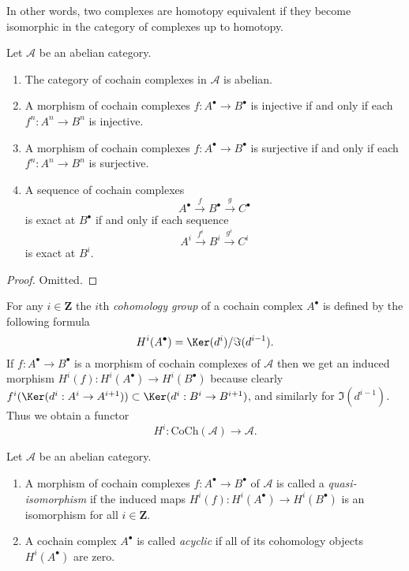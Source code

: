 \noindent
In other words, two complexes are homotopy equivalent if they become
isomorphic in the category of complexes up to homotopy.

\begin{lemma}
\label{lemma-cat-cochain-abelian}
Let $\mathcal{A}$ be an abelian category.
\begin{enumerate}
\item The category of cochain complexes in $\mathcal{A}$ is
abelian.
\item A morphism of cochain complexes
$f : A^\bullet \to B^\bullet$ is injective
if and only if each $f^n : A^n \to B^n$ is injective.
\item A morphism of cochain complexes
$f : A^\bullet \to B^\bullet$ is surjective
if and only if each $f^n : A^n \to B^n$ is surjective.
\item A sequence of cochain complexes
$$
A^\bullet \xrightarrow{f} B^\bullet \xrightarrow{g} C^\bullet
$$
is exact at $B^\bullet$ if and only if each sequence
$$
A^i \xrightarrow{f^i} B^i \xrightarrow{g^i} C^i
$$
is exact at $B^i$.
\end{enumerate}
\end{lemma}

\begin{proof}
Omitted.
\end{proof}

\noindent
For any $i \in \mathbf{Z}$ the $i$th {\it cohomology group}
of a cochain complex $A^\bullet$ is defined by
the following formula
$$
H^i(A^\bullet) = \Ker(d^i)/\Im(d^{i - 1}).
$$
If $f : A^\bullet \to B^\bullet$ is a morphism of cochain
complexes of $\mathcal{A}$ then we get an induced
morphism $H^i(f) : H^i(A^\bullet) \to H^i(B^\bullet)$
because clearly
$f^i(\Ker(d^i : A^i \to A^{i + 1})) \subset
\Ker(d^i : B^i \to B^{i + 1})$, and similarly
for $\Im(d^{i - 1})$.
Thus we obtain a functor
$$
H^i : \text{CoCh}(\mathcal{A}) \longrightarrow \mathcal{A}.
$$

\begin{definition}
\label{definition-quasi-isomorphism-cochain}
Let $\mathcal{A}$ be an abelian category.
\begin{enumerate}
\item A morphism of cochain complexes $f : A^\bullet \to B^\bullet$
of $\mathcal{A}$ is called a {\it quasi-isomorphism} if the induced
maps $H^i(f) : H^i(A^\bullet) \to H^i(B^\bullet)$
is an isomorphism for all $i \in \mathbf{Z}$.
\item A cochain complex $A^\bullet$ is called
{\it acyclic} if all of its cohomology objects
$H^i(A^\bullet)$ are zero.
\end{enumerate}
\end{definition}

